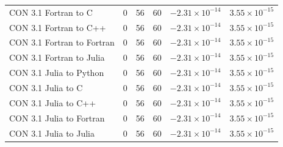 \begin{table}[ht]
{\begin{tabular}{@{}lccccc@{}}
CON 3.1 Fortran to C & 0 & 56 & 60 & $-2.31\times10^{-14}$ & $3.55\times10^{-15}$ \\
CON 3.1 Fortran to C++ & 0 & 56 & 60 & $-2.31\times10^{-14}$ & $3.55\times10^{-15}$ \\
CON 3.1 Fortran to Fortran & 0 & 56 & 60 & $-2.31\times10^{-14}$ & $3.55\times10^{-15}$ \\
CON 3.1 Fortran to Julia & 0 & 56 & 60 & $-2.31\times10^{-14}$ & $3.55\times10^{-15}$ \\
CON 3.1 Julia to Python & 0 & 56 & 60 & $-2.31\times10^{-14}$ & $3.55\times10^{-15}$ \\
CON 3.1 Julia to C & 0 & 56 & 60 & $-2.31\times10^{-14}$ & $3.55\times10^{-15}$ \\
CON 3.1 Julia to C++ & 0 & 56 & 60 & $-2.31\times10^{-14}$ & $3.55\times10^{-15}$ \\
CON 3.1 Julia to Fortran & 0 & 56 & 60 & $-2.31\times10^{-14}$ & $3.55\times10^{-15}$ \\
CON 3.1 Julia to Julia & 0 & 56 & 60 & $-2.31\times10^{-14}$ & $3.55\times10^{-15}$ \\
\bottomrule
\end{tabular}}
\end{table}
